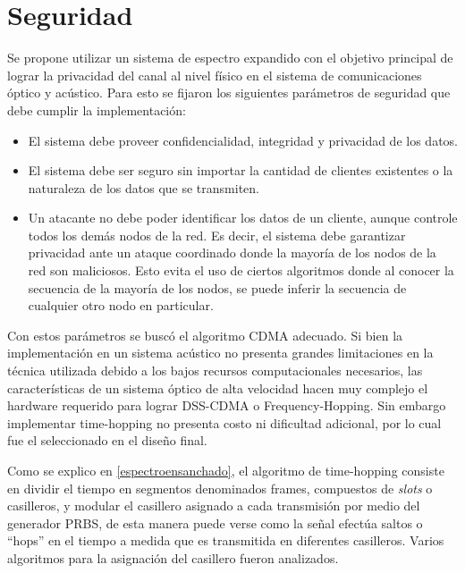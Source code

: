 \section{Seguridad}
\label{Seguridad}

Se propone utilizar un sistema de espectro expandido con el objetivo principal de lograr la privacidad del canal al nivel físico en el sistema de comunicaciones óptico y acústico.
Para esto se fijaron los siguientes parámetros de seguridad que debe cumplir la implementación:

\begin{itemize}
 \item El sistema debe proveer confidencialidad, integridad y privacidad de los datos.
 \item El sistema debe ser seguro sin importar la cantidad de clientes existentes o la naturaleza de los datos que se transmiten.
 \item Un atacante no debe poder identificar los datos de un cliente, aunque controle todos los demás nodos de la red. Es decir, el sistema debe garantizar privacidad ante un ataque coordinado donde la mayoría de los nodos de la red son maliciosos. Esto evita el uso de ciertos algoritmos \cite{gold1967optimal} donde al conocer la secuencia de la mayoría de los nodos, se puede inferir la secuencia de cualquier otro nodo en particular.
\end{itemize}

Con estos parámetros se buscó el algoritmo CDMA adecuado. Si bien la implementación en un sistema acústico no presenta grandes limitaciones en la técnica utilizada debido a los bajos recursos computacionales necesarios, las características de un sistema óptico de alta velocidad hacen muy complejo el hardware requerido para lograr DSS-CDMA o Frequency-Hopping. Sin embargo implementar time-hopping no presenta costo ni dificultad adicional, por lo cual fue el seleccionado en el diseño final.

Como se explico en \ref{espectroensanchado}, el algoritmo de time-hopping consiste en dividir el tiempo en segmentos denominados frames, compuestos de \textit{slots} o casilleros, y modular el casillero asignado a cada transmisión por medio del generador PRBS, de esta manera puede verse como la señal efectúa saltos o ``hops'' en el tiempo a medida que es transmitida en diferentes casilleros. Varios algoritmos para la asignación del casillero fueron analizados. 

